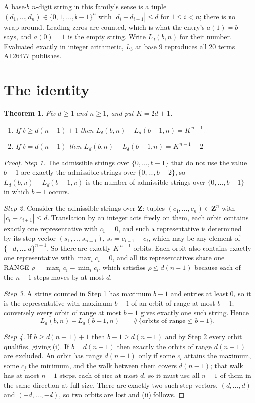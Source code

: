 \documentclass[11pt,a4paper]{article}
\theoremstyle{plain}
\newtheorem{theorem}{Theorem}
\theoremstyle{definition}
\begin{document}
A base-$b$ $n$-digit string in this family's sense is a tuple
$(d_1,\dots,d_n)\in\{0,1,\dots,b-1\}^{n}$ with $|d_i-d_{i+1}|\le d$ for $1\le i<n$; there
is no wrap-around. Leading zeros are counted, which is what the entry's $a(1)=b$ says, and
$a(0)=1$ is the empty string. Write $L_d(b,n)$ for their number. Evaluated exactly in integer
arithmetic, $L_{3}$ at base $9$ reproduces all $20$ terms A126477 publishes.

\section{The identity}

\begin{theorem}
Fix $d\ge1$ and $n\ge1$, and put $K=2d+1$.
\begin{enumerate}
\item[(i)] If $b\ge d(n-1)+1$ then $L_d(b,n)-L_d(b-1,n)=K^{\,n-1}$.
\item[(ii)] If $b=d(n-1)$ then $L_d(b,n)-L_d(b-1,n)=K^{\,n-1}-2$.
\end{enumerate}
\end{theorem}

\begin{proof}
\emph{Step 1.} The admissible strings over $\{0,\dots,b-1\}$ that do not use the value $b-1$
are exactly the admissible strings over $\{0,\dots,b-2\}$, so $L_d(b,n)-L_d(b-1,n)$ is the
number of admissible strings over $\{0,\dots,b-1\}$ in which $b-1$ occurs.

\emph{Step 2.} Consider the admissible strings over $\mathbf{Z}$: tuples
$(c_1,\dots,c_n)\in\mathbf{Z}^{n}$ with $|c_i-c_{i+1}|\le d$. Translation by an integer acts
freely on them, each orbit contains exactly one representative with $c_1=0$, and such a
representative is determined by its step vector $(s_1,\dots,s_{n-1})$, $s_i=c_{i+1}-c_i$,
which may be any element of $\{-d,\dots,d\}^{n-1}$. So there are exactly $K^{\,n-1}$ orbits.
Each orbit also contains exactly one representative with $\max_i c_i=0$, and all its
representatives share one RANGE $\rho=\max_ic_i-\min_ic_i$, which satisfies
$\rho\le d(n-1)$ because each of the $n-1$ steps moves by at most $d$.

\emph{Step 3.} A string counted in Step 1 has maximum $b-1$ and entries at least $0$, so it is
the representative with maximum $b-1$ of an orbit of range at most $b-1$; conversely every orbit
of range at most $b-1$ gives exactly one such string. Hence
\[
L_d(b,n)-L_d(b-1,n)\;=\;\#\{\text{orbits of range}\le b-1\} .
\]

\emph{Step 4.} If $b\ge d(n-1)+1$ then $b-1\ge d(n-1)$ and by Step 2 every orbit qualifies,
giving (i). If $b=d(n-1)$ then exactly the orbits of range $d(n-1)$ are excluded. An orbit has
range $d(n-1)$ only if some $c_i$ attains the maximum, some $c_j$ the minimum, and the walk
between them covers $d(n-1)$; that walk has at most $n-1$ steps, each of size at most $d$, so it
must use all $n-1$ of them in the same direction at full size. There are exactly two such step
vectors, $(d,\dots,d)$ and $(-d,\dots,-d)$, so two orbits are lost and (ii) follows.
\end{proof}
\end{document}
